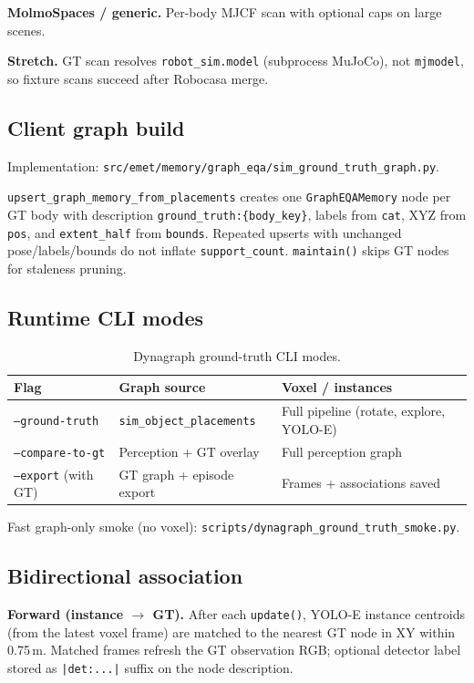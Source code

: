 \textbf{MolmoSpaces / generic.} Per-body MJCF scan with optional caps on large scenes.

\textbf{Stretch.} GT scan resolves \texttt{robot\_sim.model} (subprocess MuJoCo), not \texttt{mjmodel}, so fixture scans succeed after Robocasa merge.

\subsection{Client graph build}

Implementation: \texttt{src/emet/memory/graph\_eqa/sim\_ground\_truth\_graph.py}.

\texttt{upsert\_graph\_memory\_from\_placements} creates one \texttt{GraphEQAMemory} node per GT body with description \texttt{ground\_truth:\{body\_key\}}, labels from \texttt{cat}, XYZ from \texttt{pos}, and \texttt{extent\_half} from \texttt{bounds}.
Repeated upserts with unchanged pose/labels/bounds do not inflate \texttt{support\_count}.
\texttt{maintain()} skips GT nodes for staleness pruning.

\subsection{Runtime CLI modes}

\begin{table}[h]
  \centering
  \small
  \caption{Dynagraph ground-truth CLI modes.}
  \begin{tabular}{@{}lll@{}}
    \toprule
    Flag & Graph source & Voxel / instances \\
    \midrule
    \texttt{--ground-truth} & \texttt{sim\_object\_placements} & Full pipeline (rotate, explore, YOLO-E) \\
    \texttt{--compare-to-gt} & Perception + GT overlay & Full perception graph \\
    \texttt{--export} (with GT) & GT graph + episode export & Frames + associations saved \\
    \bottomrule
  \end{tabular}
\end{table}

Fast graph-only smoke (no voxel): \texttt{scripts/dynagraph\_ground\_truth\_smoke.py}.

\subsection{Bidirectional association}

\textbf{Forward (instance $\rightarrow$ GT).}
After each \texttt{update()}, YOLO-E instance centroids (from the latest voxel frame) are matched to the nearest GT node in XY within 0.75\,m.
Matched frames refresh the GT observation RGB; optional detector label stored as \texttt{|det:...|} suffix on the node description.


